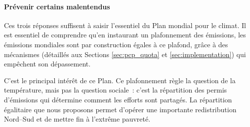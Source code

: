 \documentclass[a5paper,french,openany]{memoir}
\begin{document}
\paragraph{Prévenir certains malentendus}
Ces trois réponses suffisent à saisir l'essentiel du Plan mondial pour le climat. Il est essentiel de comprendre qu'en instaurant un plafonnement des émissions, les émissions mondiales sont par construction égales à ce plafond, grâce à des mécanismes (détaillés aux Sections \ref{sec:pcp_quota} et \ref{sec:implementation}) qui empêchent son dépassement. 

C'est le principal intérêt de ce Plan. %
Ce plafonnement règle la question de la température, %
mais pas la question sociale~: c'est la répartition des permis d'émissions qui détermine comment les efforts sont partagés. La répartition égalitaire que nous proposons permet d'opérer une importante redistribution Nord--Sud et de mettre fin à l'extrême pauvreté. 
\end{document}
